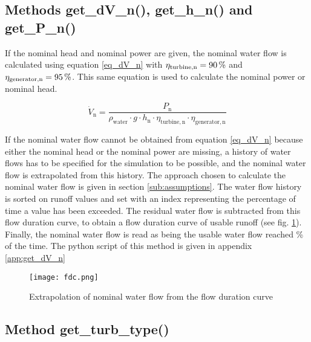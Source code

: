 \subsection{Methods get{\_}dV{\_}n(), get{\_}h{\_}n() and get{\_}P{\_}n()}

If the nominal head and nominal power are given, the nominal water flow is calculated using equation \ref{eq_dV_n} with $\eta_\mathrm{turbine, n} = \unit[90]{\%}$ and $\eta_\mathrm{generator, n} = \unit[95]{\%}$. This same equation is used to calculate the nominal power or nominal head.

\begin{equation}
\label{eq_dV_n} 
 \dot{V}_\mathrm{n}=\frac{ P_\mathrm{n}}{\rho_\mathrm{water} \cdot g  \cdot h_\mathrm{n} \cdot \eta_\mathrm{turbine, n} \cdot \eta_\mathrm{generator, n}}
\end{equation}

If the nominal water flow cannot be obtained from equation \ref{eq_dV_n} because either the nominal head or the nominal power are missing, a history of water flows has to be specified for the simulation to be possible, and the nominal water flow is extrapolated from this history. The approach chosen to calculate the nominal water flow is given in section \ref{sub:assumptions}.\newline
The water flow history is sorted on runoff values and set with an index representing the percentage of time a value has been exceeded. The residual water flow is subtracted from this flow duration curve, to obtain a flow duration curve of usable runoff (see fig. \ref{fdc}). Finally, the nominal water flow is read as being the usable water flow reached \unit[20]{\%} of the time. \newline
The python script of this method is given in appendix \ref{app:get_dV_n}

\begin{figure}[H]
\centering
\texttt{[image: fdc.png]}
\caption{Extrapolation of nominal water flow from the flow duration curve}
\label{fdc}
\end{figure}

\subsection{Method get{\_}turb{\_}type()}
\label{sub:get_type}

